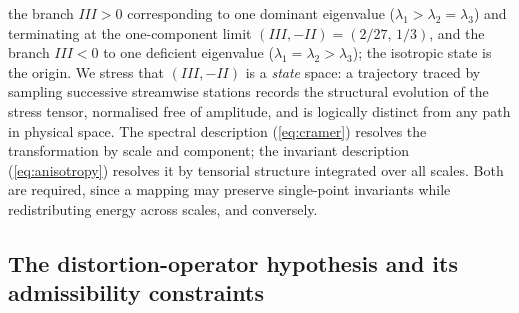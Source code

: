 \documentclass[lineno]{JFM-FLM_Au}
\begin{document}
the branch $III>0$ corresponding to one dominant eigenvalue
($\lambda_1 > \lambda_2 = \lambda_3$) and terminating at the
one-component limit
$(III,-II) = (2/27,\,1/3)$, and the branch $III<0$ to one deficient
eigenvalue ($\lambda_1 = \lambda_2 > \lambda_3$); the isotropic state is
the origin. We stress that $(III,-II)$ is a \emph{state} space: a
trajectory traced by sampling successive streamwise stations records the
structural evolution of the stress tensor, normalised free of amplitude,
and is logically distinct from any path in physical space. The spectral
description (\ref{eq:cramer}) resolves the transformation by scale and
component; the invariant description (\ref{eq:anisotropy}) resolves it by
tensorial structure integrated over all scales. Both are required, since
a mapping may preserve single-point invariants while redistributing energy
across scales, and conversely.

\subsection{The distortion-operator hypothesis and its admissibility
constraints}
\label{sec:framework_hypothesis}
\end{document}

